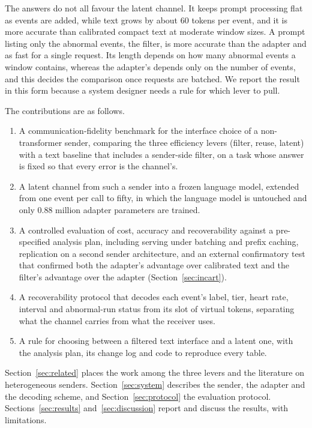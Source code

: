 The answers do not all favour the latent channel. It keeps prompt processing flat as events are added, while text grows by about 60 tokens per event, and it is more accurate than calibrated compact text at moderate window sizes. A prompt listing only the abnormal events, the filter, is more accurate than the adapter and as fast for a single request. Its length depends on how many abnormal events a window contains, whereas the adapter's depends only on the number of events, and this decides the comparison once requests are batched. We report the result in this form because a system designer needs a rule for which lever to pull.

The contributions are as follows.
\begin{enumerate}
\item A communication-fidelity benchmark for the interface choice of a non-transformer sender, comparing the three efficiency levers (filter, reuse, latent) with a text baseline that includes a sender-side filter, on a task whose answer is fixed so that every error is the channel's.
\item A latent channel from such a sender into a frozen language model, extended from one event per call to fifty, in which the language model is untouched and only 0.88 million adapter parameters are trained.
\item A controlled evaluation of cost, accuracy and recoverability against a pre-specified analysis plan, including serving under batching and prefix caching, replication on a second sender architecture, and an external confirmatory test that confirmed both the adapter's advantage over calibrated text and the filter's advantage over the adapter (Section~\ref{sec:incart}).
\item A recoverability protocol that decodes each event's label, tier, heart rate, interval and abnormal-run status from its slot of virtual tokens, separating what the channel carries from what the receiver uses.
\item A rule for choosing between a filtered text interface and a latent one, with the analysis plan, its change log and code to reproduce every table.
\end{enumerate}

Section~\ref{sec:related} places the work among the three levers and the literature on heterogeneous senders. Section~\ref{sec:system} describes the sender, the adapter and the decoding scheme, and Section~\ref{sec:protocol} the evaluation protocol. Sections~\ref{sec:results} and~\ref{sec:discussion} report and discuss the results, with limitations.
